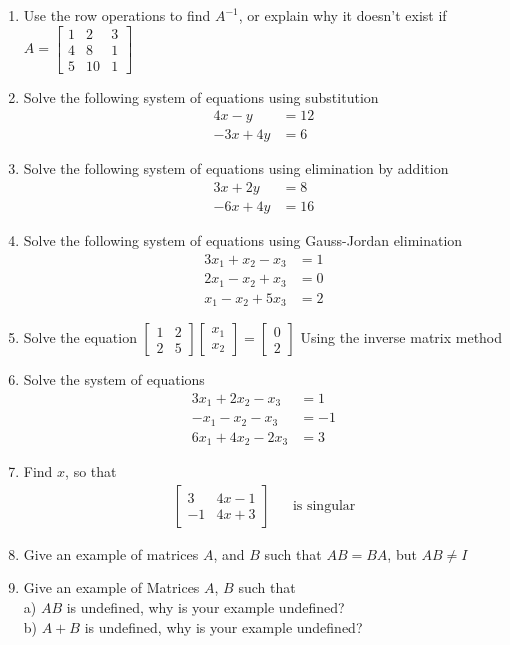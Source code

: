 \documentclass[12pt]{article}
\begin{document}
\begin{enumerate}
\item Use the row operations to find $A^{-1}$, or explain why it doesn't exist if $A= \begin{bmatrix} 1 & 2 & 3 \\ 4 & 8 & 1 \\ 5 & 10 & 1 \end{bmatrix}$

\item Solve the following system of equations using substitution
\begin{align*}
4x-y &= 12 \\
-3x+4y &= 6
\end{align*}

\item  Solve the following system of equations using elimination by addition
\begin{align*}
    3x+2y &= 8 \\
    -6x + 4y &= 16
\end{align*}

\item Solve the following system of equations using Gauss-Jordan elimination
\begin{align*}
    3x_1+x_2-x_3 &= 1 \\
    2x_1-x_2+x_3 &= 0 \\
    x_1-x_2+5x_3 &= 2
\end{align*}
\item Solve the equation $\begin{bmatrix} 1 & 2 \\ 2 & 5 \end{bmatrix} \begin{bmatrix} x_1 \\ x_2 \end{bmatrix}=\begin{bmatrix} 0 \\ 2 \end{bmatrix}$  Using the inverse matrix method
\item Solve the system of equations
\begin{align*}
    3x_1+2x_2-x_3 &= 1 \\
    -x_1-x_2-x_3 &= -1 \\
    6x_1+4x_2-2x_3 &=3
\end{align*}
\item Find $x$, so that
\begin{align*}
	\begin{bmatrix}
		3 & 4x-1 \\
		-1 & 4x+3
	\end{bmatrix} & 
	&\text{is singular}
\end{align*}
\item Give an example of matrices $A$, and $B$ such that $AB=BA$, but $AB \neq I$
\item Give an example of Matrices $A$, $B$ such that \\
    a) $AB$ is undefined, why is your example undefined? \\
    b) $A+B$ is undefined, why is your example undefined?
    
\end{enumerate}


\begin{align*}
\end{align*}

\begin{align*}
\end{align*}
\end{document}
